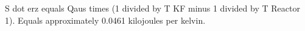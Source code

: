 S dot erz equals Qaus times (1 divided by T KF minus 1 divided by T Reactor 1).  
Equals approximately 0.0461 kilojoules per kelvin.